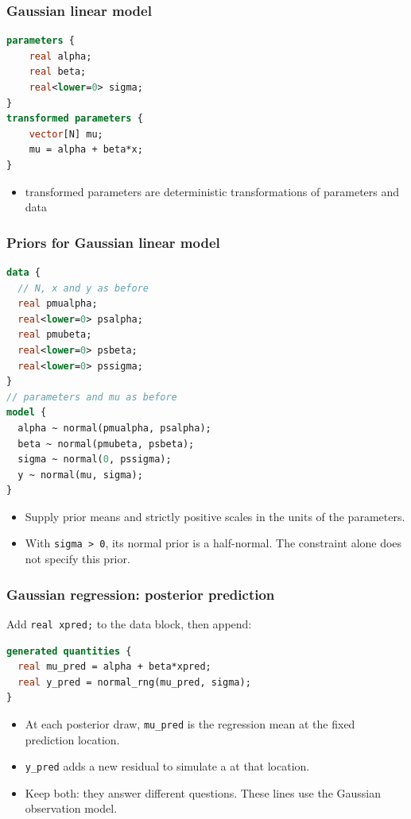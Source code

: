 \documentclass[10pt]{beamer}
\begin{document}
\begin{frame}[fragile]

\frametitle{Gaussian linear model}
  {\small
  \begin{lstlisting}[language=Stan]
parameters {
    real alpha;
    real beta;
    real<lower=0> sigma;
}
transformed parameters {
    vector[N] mu;
    mu = alpha + beta*x;
}
\end{lstlisting}
  }
  \begin{itemize}
  \item transformed parameters are deterministic transformations of parameters and data
  \end{itemize}
\end{frame}

\begin{frame}[fragile]

\frametitle{Priors for Gaussian linear model}
  {\small
  \begin{lstlisting}[language=Stan]
data {
  // N, x and y as before
  real pmualpha;
  real<lower=0> psalpha;
  real pmubeta;
  real<lower=0> psbeta;
  real<lower=0> pssigma;
}
// parameters and mu as before
model {
  alpha ~ normal(pmualpha, psalpha);
  beta ~ normal(pmubeta, psbeta);
  sigma ~ normal(0, pssigma);
  y ~ normal(mu, sigma);
}
  \end{lstlisting}
}
\begin{itemize}
\item Supply prior means and strictly positive scales in the units of the parameters.
\item With \texttt{sigma > 0}, its normal prior is a half-normal. The constraint alone does not specify this prior.
\end{itemize}
\end{frame}

\begin{frame}[fragile]
\frametitle{Gaussian regression: posterior prediction}

Add \texttt{real xpred;} to the data block, then append:
{\small
\begin{lstlisting}[language=Stan]
generated quantities {
  real mu_pred = alpha + beta*xpred;
  real y_pred = normal_rng(mu_pred, sigma);
}
\end{lstlisting}
}
\begin{itemize}
\item At each posterior draw, \texttt{mu\_pred} is the regression mean
  at the fixed prediction location.
\item \texttt{y\_pred} adds a new residual to simulate a
   at that location.
\item Keep both: they answer different questions.
  These lines use the Gaussian observation model.
\end{itemize}
\end{frame}
\end{document}
